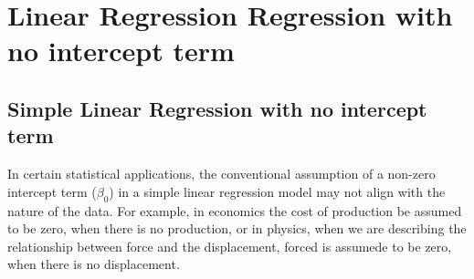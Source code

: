 \documentclass[12pt,a4paper,oneside]{book} %
\begin{document}








	\clearpage


\chapter{Linear Regression Regression with no intercept term}

	\section{Simple Linear Regression with no intercept term}

	In certain statistical applications, the conventional assumption of a non-zero intercept term ($\beta_0$) in a simple linear regression model may not align with the nature of the data. For example, in economics the cost of production be assumed to be zero, when there is no production, or in physics, when we are describing the relationship between force and the displacement, forced is assumede to be zero, when there is no displacement.
	
\end{document}
